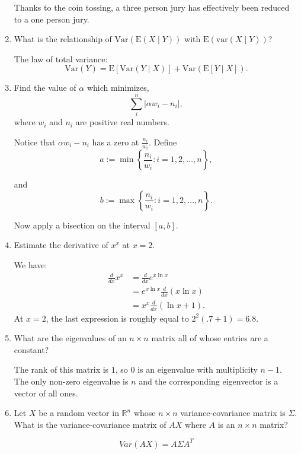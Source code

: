 \documentclass{amsart}
\theoremstyle{plain}
\numberwithin{equation}{section}
\begin{document}
\begin{enumerate}
Thanks to the coin tossing, a three person jury has 
effectively been reduced to a one person jury. 


\item What is the relationship of $\mathrm{Var}(\mathrm{E}(X\mid Y))$ with
$\mathrm{E}(\mathrm{var}(X\mid Y))$?

The law of total variance:
$$\mathrm{Var}(Y)=\mathrm{E}[\mathrm{Var}(Y\mid X)]+
\mathrm{Var}(\mathrm{E}[Y\mid X]).$$

\item Find the value of $\alpha$ which minimizes,
\begin{equation*}
\sum_{i}^{n} \left|\alpha w_i - n_i\right|,
\end{equation*}
where $w_i$ and $n_i$ are positive real numbers.

Notice that $\alpha w_i - n_i$ has a zero at $\frac{n_i}{w_i}$. 
Define 
\begin{equation*}
a := \min \left\{ \frac{n_i}{w_i}: i = 1, 2, \ldots, n \right\},
\end{equation*}

and 
$$b := \max \left\{ \frac{n_i}{w_i}: i = 1, 2, \ldots, n \right\}.$$

Now apply a bisection on the interval $[a, b]$.

\item Estimate the derivative of $x^x$ at $x=2$.

We have:
\begin{align*}
\frac{d}{dx}x^x &= \frac{d}{dx} e^{ x\ln x} \\
&= e^{x \ln x }\frac{d}{dx}(x \ln x)\\
&= x^{x}\frac{d}{dx}(\ln x + 1 ).
\end{align*}
At $x=2$, the last expression is roughly equal to
$2^2(.7 + 1 )=6.8$.
\item What are the eigenvalues of an $n \times n$
 matrix all of whose entries are a constant?

The rank of this matrix is $1$, so $0$ is an eigenvalue
with multiplicity $n-1$. The only non-zero eigenvalue
is $n$ and the corresponding eigenvector is 
a vector of all ones. 

\item Let $X$ be a random vector in $\mathbb{R}^n$ whose
$n \times n$ variance-covariance 
matrix is $\Sigma$. What is the variance-covariance matrix of 
$AX$ where $A$ is an $n \times n$ matrix?

\begin{equation*}
Var(AX) = A \Sigma A^{T}
\end{equation*}


\end{enumerate}
\end{document}
